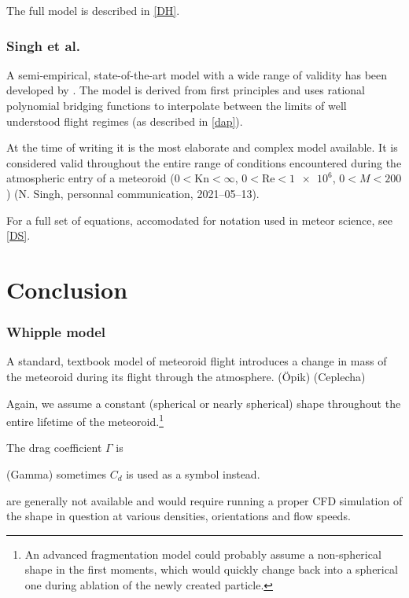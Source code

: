            The full model is described in \cref{DH}.

        \subsubsection{Singh et al.} \label{fdmS}
            A semi-empirical, state-of-the-art model with a wide range of validity has been developed by
            \citet{singh+2020}. The model is derived from first principles and
            uses rational polynomial bridging functions to interpolate between
            the limits of well understood flight regimes (as described in \cref{dap}).

            At the time of writing it is the most elaborate and complex model available.
            It is considered valid throughout the entire range of
            conditions encountered during the atmospheric entry of a meteoroid
            ($0 < \mathrm{Kn} < \infty$, $0 < \mathrm{Re} < \num{1e6}$, $0 < M < 200$)
            (N. Singh, personnal communication, 2021--05--13).

            For a full set of equations, accomodated for notation used in meteor science, see \cref{DS}.

\section{Conclusion} \label{dc}

    \subsubsection{Whipple model} \label{mmw}
        A standard, textbook model of meteoroid flight introduces a change in mass of the meteoroid
        during its flight through the atmosphere. 
        (Öpik) (Ceplecha)

        Again, we assume a constant (spherical or nearly spherical) shape throughout the entire
        lifetime of the meteoroid.\footnote{An advanced fragmentation model could probably assume a non-spherical
        shape in the first moments, which would quickly change back into a spherical one during ablation
        of the newly created particle.}

        The drag coefficient $\Gamma$ is 

        (Gamma) sometimes $C_d$ is used as a symbol instead.

        are generally not available and would require running a proper CFD simulation
        of the shape in question at various densities, orientations and flow speeds.

